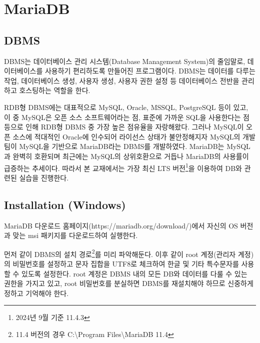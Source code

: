 \section{MariaDB}\label{sect:maria-db}

\subsection*{DBMS}

DBMS는 데이터베이스 관리 시스템(Database Management System)의 줄임말로, 데이터베이스를 사용하기 편리하도록 만들어진 프로그램이다. DBMS는 데이터를 다루는 작업, 데이터베이스 생성, 사용자 생성, 사용자 권한 설정 등 데이터베이스 전반을 관리하고 호스팅하는 역할을 한다.

RDB형 DBMS에는 대표적으로 MySQL, Oracle, MSSQL, PostgreSQL 등이 있고, 이 중 MySQL은 오픈 소스 소프트웨어라는 점, 표준에 가까운 SQL을 사용한다는 점 등으로 인해 RDB형 DBMS 중 가장 높은 점유율을 자랑해왔다. 그러나 MySQL이 오픈 소스에 적대적인 Oracle에 인수되어 라이선스 상태가 불안정해지자 MySQL의 개발팀이 MySQL을 기반으로 MariaDB라는 DBMS를 개발하였다. MariaDB는 MySQL과 완벽히 호환되며 최근에는 MySQL의 상위호환으로 거듭나 MariaDB의 사용률이 급증하는 추세이다. 따라서 본 교재에서는 가장 최신 LTS 버전\footnote{2024년 9월 기준 11.4.3}을 이용하여 DB와 관련된 실습을 진행한다.

\subsection*{Installation (Windows)}

MariaDB 다운로드 홈페이지(https://mariadb.org/download/)에서 자신의 OS 버전과 맞는 msi 패키지를 다운로드하여 실행한다.


먼저 \과 같이 DBMS의 설치 경로\footnote{11.4 버전의 경우 C:\textbackslash{}Program Files\textbackslash{}MariaDB 11.4}를 미리 파악해둔다. 이후 \와 같이 root 계정(관리자 계정)의 비밀번호를 설정하고 문자 집합을 UTF8로 체크하여 한글 및 기타 특수문자를 사용할 수 있도록 설정한다. root 계정은 DBMS 내의 모든 DB와 데이터를 다룰 수 있는 권한을 가지고 있고, root 비밀번호를 분실하면 DBMS를 재설치해야 하므로 신중하게 정하고 기억해야 한다.

